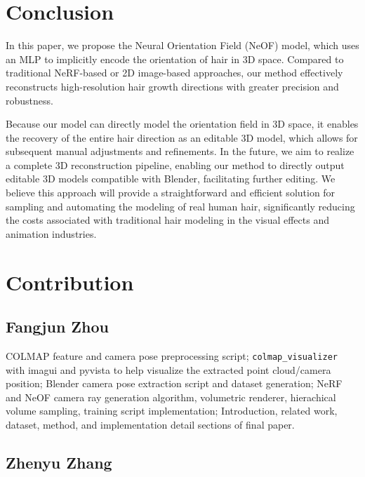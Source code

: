 \documentclass{article}
\begin{document}
\section{Conclusion}
In this paper, we propose the Neural Orientation Field (NeOF) model, which uses an MLP to implicitly encode the orientation of hair in 3D space. Compared to traditional NeRF-based or 2D image-based approaches, our method effectively reconstructs high-resolution hair growth directions with greater precision and robustness. 

Because our model can directly model the orientation field in 3D space, it enables the recovery of the entire hair direction as an editable 3D model, which allows for subsequent manual adjustments and refinements. In the future, we aim to realize a complete 3D reconstruction pipeline, enabling our method to directly output editable 3D models compatible with Blender, facilitating further editing. We believe this approach will provide a straightforward and efficient solution for sampling and automating the modeling of real human hair, significantly reducing the costs associated with traditional hair modeling in the visual effects and animation industries.

\newpage




\newpage

\section{Contribution}

\subsection{Fangjun Zhou}

COLMAP feature and camera pose preprocessing script; \texttt{colmap\_visualizer} with imagui and pyvista to help visualize the extracted point cloud/camera position; Blender camera pose extraction script and dataset generation; NeRF and NeOF camera ray generation algorithm, volumetric renderer, hierachical volume sampling, training script implementation; Introduction, related work, dataset, method, and implementation detail sections of final paper.

\subsection{Zhenyu Zhang}
\end{document}
